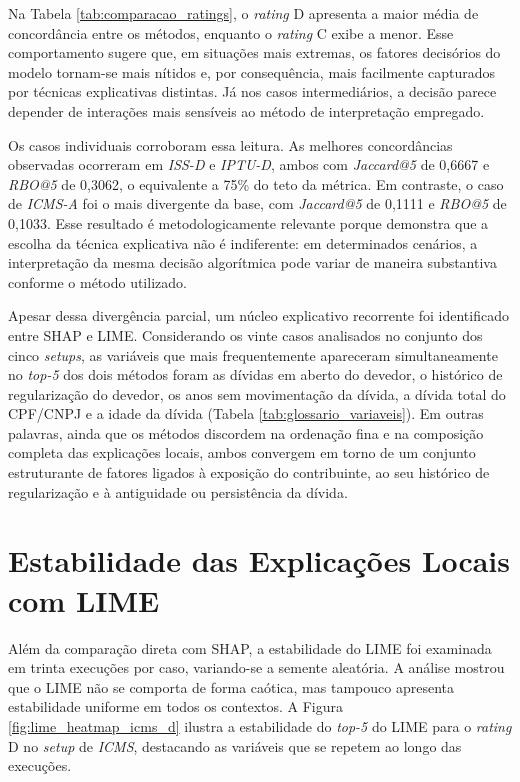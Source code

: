 Na Tabela \ref{tab:comparacao_ratings}, o \textit{rating} D apresenta a maior média de concordância entre os métodos, enquanto o \textit{rating} C exibe a menor. Esse comportamento sugere que, em situações mais extremas, os fatores decisórios do modelo tornam-se mais nítidos e, por consequência, mais facilmente capturados por técnicas explicativas distintas. Já nos casos intermediários, a decisão parece depender de interações mais sensíveis ao método de interpretação empregado.

Os casos individuais corroboram essa leitura. As melhores concordâncias observadas ocorreram em \textit{ISS-D} e \textit{IPTU-D}, ambos com \textit{Jaccard@5} de 0,6667 e \textit{RBO@5} de 0,3062, o equivalente a 75\% do teto da métrica. Em contraste, o caso de \textit{ICMS-A} foi o mais divergente da base, com \textit{Jaccard@5} de 0,1111 e \textit{RBO@5} de 0,1033. Esse resultado é metodologicamente relevante porque demonstra que a escolha da técnica explicativa não é indiferente: em determinados cenários, a interpretação da mesma decisão algorítmica pode variar de maneira substantiva conforme o método utilizado.

Apesar dessa divergência parcial, um núcleo explicativo recorrente foi identificado entre SHAP e LIME. Considerando os vinte casos analisados no conjunto dos cinco \textit{setups}, as variáveis que mais frequentemente apareceram simultaneamente no \textit{top-5} dos dois métodos foram as dívidas em aberto do devedor, o histórico de regularização do devedor, os anos sem movimentação da dívida, a dívida total do CPF/CNPJ e a idade da dívida (Tabela \ref{tab:glossario_variaveis}). Em outras palavras, ainda que os métodos discordem na ordenação fina e na composição completa das explicações locais, ambos convergem em torno de um conjunto estruturante de fatores ligados à exposição do contribuinte, ao seu histórico de regularização e à antiguidade ou persistência da dívida.

\section{Estabilidade das Explicações Locais com LIME}

Além da comparação direta com SHAP, a estabilidade do LIME foi examinada em trinta execuções por caso, variando-se a semente aleatória. A análise mostrou que o LIME não se comporta de forma caótica, mas tampouco apresenta estabilidade uniforme em todos os contextos. A Figura \ref{fig:lime_heatmap_icms_d} ilustra a estabilidade do \textit{top-5} do LIME para o \textit{rating} D no \textit{setup} de \textit{ICMS}, destacando as variáveis que se repetem ao longo das execuções.

